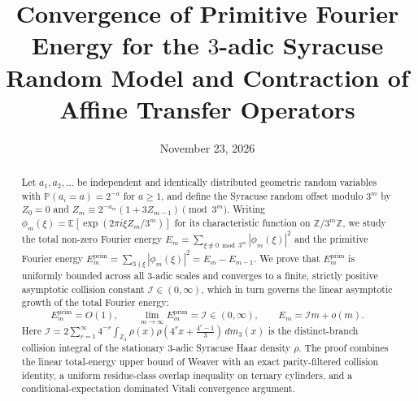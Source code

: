 \documentclass[11pt,a4paper]{article}
\title{\textbf{Convergence of Primitive Fourier Energy for the $3$-adic Syracuse Random Model and Contraction of Affine Transfer Operators}}
\author{}
\date{November 23, 2026}
\numberwithin{equation}{section}
\theoremstyle{definition}
\theoremstyle{remark}
\newcommand{\Z}{\mathbb{Z}}
\newcommand{\E}{\mathbb{E}}
\renewcommand{\P}{\mathbb{P}}
\newcommand{\cI}{\mathcal{I}}
\newcommand{\prim}{\mathrm{prim}}
\begin{document}
\maketitle

\begin{abstract}
Let $a_1, a_2, \dots$ be independent and identically distributed geometric random variables with $\P(a_i = a) = 2^{-a}$ for $a \ge 1$, and define the Syracuse random offset modulo $3^m$ by $Z_0 = 0$ and $Z_m \equiv 2^{-a_m}(1 + 3 Z_{m-1}) \pmod{3^m}$. Writing $\phi_m(\xi) = \E[\exp(2\pi i \xi Z_m / 3^m)]$ for its characteristic function on $\Z/3^m\Z$, we study the total non-zero Fourier energy $E_m = \sum_{\xi \not\equiv 0 \bmod 3^m} |\phi_m(\xi)|^2$ and the primitive Fourier energy $E_m^{\prim} = \sum_{3 \nmid \xi} |\phi_m(\xi)|^2 = E_m - E_{m-1}$. We prove that $E_m^{\prim}$ is uniformly bounded across all $3$-adic scales and converges to a finite, strictly positive asymptotic collision constant $\cI \in (0, \infty)$, which in turn governs the linear asymptotic growth of the total Fourier energy:
\[
 \boxed{E_m^{\prim} = O(1), \qquad \lim_{m \to \infty} E_m^{\prim} = \cI \in (0, \infty), \qquad E_m = \cI m + o(m).}
\]
Here $\cI = 2 \sum_{r=1}^\infty 4^{-r} \int_{\Z_3} \rho(x)\rho(4^r x + \frac{4^r - 1}{3})\,dm_3(x)$ is the distinct-branch collision integral of the stationary $3$-adic Syracuse Haar density $\rho$. The proof combines the linear total-energy upper bound of Weaver with an exact parity-filtered collision identity, a uniform residue-class overlap inequality on ternary cylinders, and a conditional-expectation dominated Vitali convergence argument.


\end{abstract}
\end{document}

